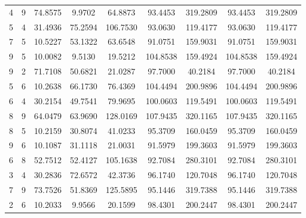 \documentclass[withoutpreface,bwprint]{cumcmthesis}
\begin{document}
\begin{appendices}
\begin{table}[htbp!]
\begin{tabular}{@{}ccccccccc@{}}
				4              & 9              & 74.8575     & 9.9702      & 64.8873     & 93.4453         & 319.2809        & 93.4453         & 319.2809        \\
				5              & 4              & 31.4936     & 75.2594     & 106.7530    & 93.0630         & 119.4177        & 93.0630         & 119.4177        \\
				7              & 5              & 10.5227     & 53.1322     & 63.6548     & 91.0751         & 159.9031        & 91.0751         & 159.9031        \\
				9              & 5              & 10.0082     & 9.5130      & 19.5212     & 104.8538        & 159.4924        & 104.8538        & 159.4924        \\
				9              & 2              & 71.7108     & 50.6821     & 21.0287     & 97.7000         & 40.2184         & 97.7000         & 40.2184         \\
				5              & 6              & 10.2638     & 66.1730     & 76.4369     & 104.4494        & 200.9896        & 104.4494        & 200.9896        \\
				6              & 4              & 30.2154     & 49.7541     & 79.9695     & 100.0603        & 119.5491        & 100.0603        & 119.5491        \\
				8              & 9              & 64.0479     & 63.9690     & 128.0169    & 107.9435        & 320.1165        & 107.9435        & 320.1165        \\
				8              & 5              & 10.2159     & 30.8074     & 41.0233     & 95.3709         & 160.0459        & 95.3709         & 160.0459        \\
				9              & 6              & 10.1087     & 31.1118     & 21.0031     & 91.5979         & 199.3603        & 91.5979         & 199.3603        \\
				6              & 8              & 52.7512     & 52.4127     & 105.1638    & 92.7084         & 280.3101        & 92.7084         & 280.3101        \\
				3              & 4              & 30.2836     & 72.6572     & 42.3736     & 96.1740         & 120.7048        & 96.1740         & 120.7048        \\
				7              & 9              & 73.7526     & 51.8369     & 125.5895    & 95.1446         & 319.7388        & 95.1446         & 319.7388        \\
				2              & 6              & 10.2033     & 9.9566      & 20.1599     & 98.4301         & 200.2447        & 98.4301         & 200.2447        \\

\end{tabular}
\end{table}
\end{appendices}
\end{document}
